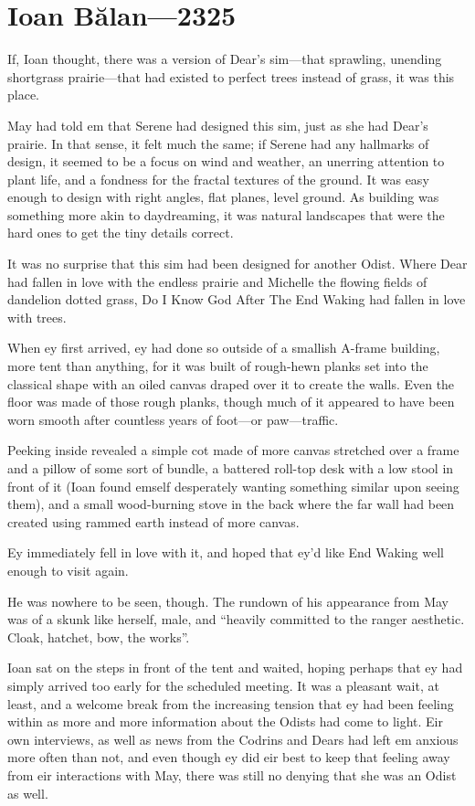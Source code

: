 \hypertarget{ioan-bux103lan-2325}{%
\chapter{Ioan Bălan—2325}\label{ioan-bux103lan-2325}}

If, Ioan thought, there was a version of Dear's sim---that sprawling, unending shortgrass prairie---that had existed to perfect trees instead of grass, it was this place.

May had told em that Serene had designed this sim, just as she had Dear's prairie. In that sense, it felt much the same; if Serene had any hallmarks of design, it seemed to be a focus on wind and weather, an unerring attention to plant life, and a fondness for the fractal textures of the ground. It was easy enough to design with right angles, flat planes, level ground. As building was something more akin to daydreaming, it was natural landscapes that were the hard ones to get the tiny details correct.

It was no surprise that this sim had been designed for another Odist. Where Dear had fallen in love with the endless prairie and Michelle the flowing fields of dandelion dotted grass, Do I Know God After The End Waking had fallen in love with trees.

When ey first arrived, ey had done so outside of a smallish A-frame building, more tent than anything, for it was built of rough-hewn planks set into the classical shape with an oiled canvas draped over it to create the walls. Even the floor was made of those rough planks, though much of it appeared to have been worn smooth after countless years of foot---or paw---traffic.

Peeking inside revealed a simple cot made of more canvas stretched over a frame and a pillow of some sort of bundle, a battered roll-top desk with a low stool in front of it (Ioan found emself desperately wanting something similar upon seeing them), and a small wood-burning stove in the back where the far wall had been created using rammed earth instead of more canvas.

Ey immediately fell in love with it, and hoped that ey'd like End Waking well enough to visit again.

He was nowhere to be seen, though. The rundown of his appearance from May was of a skunk like herself, male, and ``heavily committed to the ranger aesthetic. Cloak, hatchet, bow, the works''.

Ioan sat on the steps in front of the tent and waited, hoping perhaps that ey had simply arrived too early for the scheduled meeting. It was a pleasant wait, at least, and a welcome break from the increasing tension that ey had been feeling within as more and more information about the Odists had come to light. Eir own interviews, as well as news from the Codrins and Dears had left em anxious more often than not, and even though ey did eir best to keep that feeling away from eir interactions with May, there was still no denying that she was an Odist as well.

